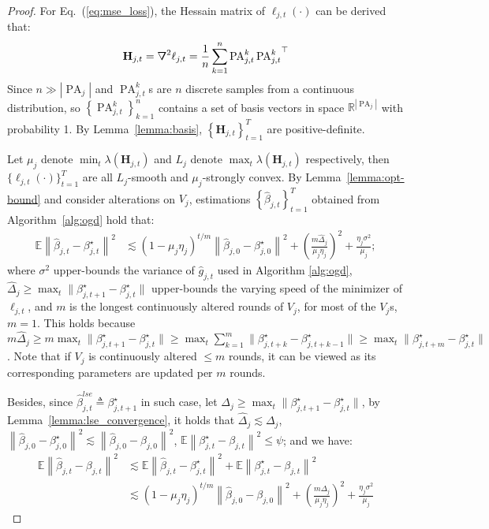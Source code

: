 \documentclass{article}
\theoremstyle{plain}
\theoremstyle{definition}
\theoremstyle{remark}
\def \Eq {Eq.}
\def \H {\mathbf{H}}
\def \PA {\operatorname{PA}}
\begin{document}
\begin{proof}
For \Eq~(\ref{eq:mse_loss}), the Hessain matrix of $\ell_{j,t}(\cdot)$ can be derived that:
\[
  \H_{j, t} = \reflectbox{$\nabla$}^2\ell_{j,t} = \frac{1}{n}\sum_{k=1}^{n} \PA^k_{j, t} {\PA^k_{j, t}}^\top
\]
Since $n\gg \left|\PA_{j}\right|$ and $\PA^k_{j, t}$s are $n$ discrete samples from a continuous distribution, so $\left\{\PA^k_{j, t}\right\}_{k=1}^{n}$ contains a set of basis vectors in space $\mathbb{R}^{\left|\PA_{j}\right|}$ with probability 1. By Lemma~\ref{lemma:basis}, $\left\{\H_{j, t}\right\}_{t=1}^T$ are positive-definite. 

Let $\mu_j$ denote $\min_t \lambda\left(\H_{j, t}\right)$ and $L_j$ denote $\max_t \lambda\left(\H_{j, t}\right)$ respectively, then $\{\ell_{j, t}(\cdot)\}_{t=1}^T$ are all $L_j$-smooth and $\mu_j$-strongly convex. By Lemma~\ref{lemma:opt-bound} and consider alterations on $V_j$, estimations $\left\{\hat{\beta}_{j, t}\right\}_{t=1}^T$ obtained from Algorithm~\ref{alg:ogd} hold that:
\[
  \begin{aligned}
  \mathbb{E}\left\|\hat{\beta}_{j, t}-\beta^\star_{j, t}\right\|^2 
  &\lesssim (1-\mu_j \eta_j)^{t/m}\left\|\hat{\beta}_{j, 0}-\beta^\star_{j, 0}\right\|^2+\left(\frac{m\hat{\Delta}_j}{\mu_j \eta_j}\right)^2+\frac{\eta_j \sigma^2}{\mu_j};
  \end{aligned}
\]
where $\sigma^2$ upper-bounds the variance of $\hat{g}_{j, t}$ used in Algorithm \ref{alg:ogd}, $\hat{\Delta}_j \geq \max_t \|\beta^\star_{j,t+1} - \beta^\star_{j, t}\|$ upper-bounds the varying speed of the minimizer of $\ell_{j,t}$, and $m$ is the longest continuously altered rounds of $V_j$, for most of the $V_j$s, $m = 1$. 
This holds because $m\hat{\Delta}_j\geq m\max_t \|\beta^\star_{j,t+1} - \beta^\star_{j, t}\|\geq\max_t\sum_{k=1}^{m} \|\beta^\star_{j,t+k} - \beta^\star_{j, t+k-1}\|\geq\max_t \|\beta^\star_{j,t+m} - \beta^\star_{j, t}\|$. 
Note that if $V_j$ is continuously altered $\leq m$ rounds, it can be viewed as its corresponding parameters are updated per $m$ rounds.

Besides, since $\hat{\beta}^{lse}_{j, t}\triangleq\beta^\star_{j,t+1}$ in such case, let $\Delta_j \geq \max_t \|\beta^\star_{j,t+1} - \beta^\star_{j, t}\|$, by Lemma~\ref{lemma:lse_convergence}, it holds that $\hat{\Delta}_j\lesssim\Delta_j$, $\left\|\hat{\beta}_{j, 0}-\beta^\star_{j, 0}\right\|^2\lesssim\left\|\hat{\beta}_{j, 0}-\beta_{j, 0}\right\|^2$,  $\mathbb{E}\left\|\beta^\star_{j, t}-\beta_{j, t}\right\|^2\leq \psi$; and we have:
\[
  \begin{aligned}
    \mathbb{E}\left\|\hat{\beta}_{j, t} - \beta_{j, t}\right\|^2
    &\lesssim \mathbb{E}\left\|\hat{\beta}_{j, t} - \beta^\star_{j, t}\right\|^2 + \mathbb{E}\left\|\beta^\star_{j, t}-\beta_{j, t}\right\|^2\\
    &\lesssim (1-\mu_j \eta_j)^{t/m}\left\|\hat{\beta}_{j, 0}-\beta_{j, 0}\right\|^2+\left(\frac{m\Delta_j}{\mu_j \eta_j}\right)^2+\frac{\eta_j \sigma^2}{\mu_j}
    \end{aligned}
\]
\end{proof}
\end{document}
